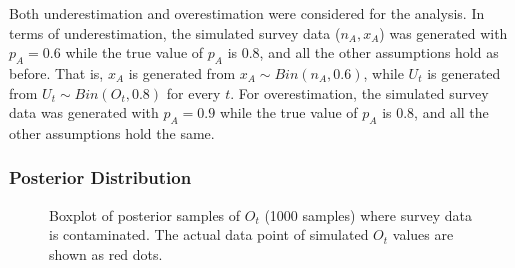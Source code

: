 \documentclass[12pt]{article}
\begin{document}
Both underestimation and overestimation were considered for the analysis. In terms of underestimation, the simulated survey data ($n_A, x_A$) was generated with $p_A=0.6$ while the true value of $p_A$ is 0.8, and all the other assumptions hold as before. That is, $x_A$ is generated from $x_A \sim Bin(n_A, 0.6)$, while $U_t$ is generated from $U_t \sim Bin(O_t, 0.8)$ for every $t$. For overestimation, the simulated survey data was generated with $p_A=0.9$ while the true value of $p_A$ is 0.8, and all the other assumptions hold the same.  \\

\subsubsection{Posterior Distribution}

\begin{figure}[htb]
	\centering
	\caption[two early result box plots:]{Boxplot of posterior samples of $O_t$ (1000 samples) where survey data is contaminated.  The actual data point of simulated $O_t$ values are shown as red dots.}
	\label{contam_ot}
\end{figure}
\end{document}
